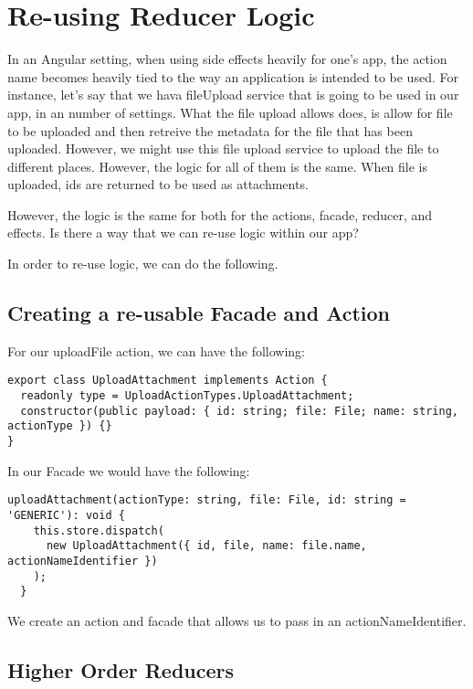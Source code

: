 \maketitle{}
\section{ Re-using Reducer Logic }

In an Angular setting, when using side effects heavily for one's app, the action
name becomes heavily tied to the way an application is intended to be used. For
instance, let's say that we hava fileUpload service that is going to be used in
our app, in an number of settings. What the file upload allows does, is allow
for file to be uploaded and then retreive the metadata for the file that has
been uploaded. However, we might use this file upload service to upload the
file to different places. However, the logic for all of them is the same. When
file is uploaded, ids are returned to be used as attachments.

However, the logic is the same for both for the actions, facade, reducer, and
effects. Is there a way that we can re-use logic within our app?

In order to re-use logic, we can do the following.

\subsection{Creating a re-usable Facade and Action}
For our uploadFile action, we can have the following:
\begin{lstlisting}
export class UploadAttachment implements Action {
  readonly type = UploadActionTypes.UploadAttachment;
  constructor(public payload: { id: string; file: File; name: string, actionType }) {}
}
\end{lstlisting}

In our Facade we would have the following:

\begin{lstlisting}
uploadAttachment(actionType: string, file: File, id: string = 'GENERIC'): void {
    this.store.dispatch(
      new UploadAttachment({ id, file, name: file.name, actionNameIdentifier })
    );
  }
\end{lstlisting}

We create an action and facade that allows us to pass in an
actionNameIdentifier.

\subsection{Higher Order Reducers}

